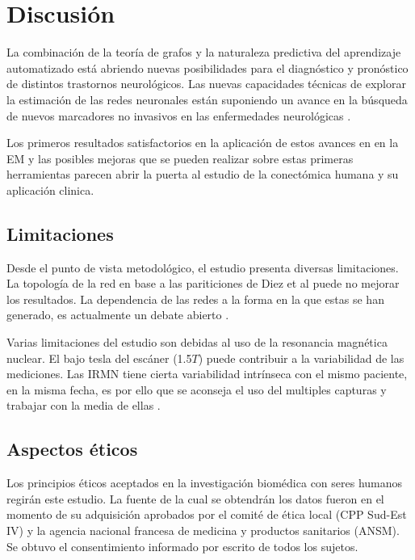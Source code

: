 \documentclass[fleqn,12pt]{UICArticle} %
\begin{document}
\section{Discusión}

La combinación de la teoría de grafos y la naturaleza predictiva del aprendizaje automatizado está abriendo nuevas posibilidades para el diagnóstico y pronóstico de distintos trastornos neurológicos. Las nuevas capacidades técnicas de explorar la estimación de las redes neuronales están suponiendo un avance en la búsqueda de nuevos marcadores no invasivos en las enfermedades neurológicas \cite{Tymofiyeva2017,Fornito2015,Sun2016}.

Los primeros resultados satisfactorios en la aplicación de estos avances en en la EM \cite{Kocevar2016,Muthuraman2016} y las posibles mejoras que se pueden realizar sobre estas primeras herramientas parecen abrir la puerta al estudio de la conectómica humana y su aplicación clinica.

\subsection{Limitaciones}

Desde el punto de vista metodológico, el estudio presenta diversas limitaciones. La topología de la red en base a las pariticiones de Diez et al puede no mejorar los resultados. La dependencia de las redes a la forma en la que estas se han generado, es actualmente un debate abierto \cite{Zalesky2010}. 

Varias limitaciones del estudio son debidas al uso de la resonancia magnética nuclear. El bajo tesla del escáner (1.5$T$) puede contribuir a la variabilidad de las mediciones. Las IRMN tiene cierta variabilidad intrínseca con el mismo paciente, en la misma fecha, es por ello que se aconseja el uso del multiples capturas y trabajar con la media de ellas \cite{Landman2007}.

\subsection{Aspectos éticos}

Los principios éticos aceptados en la investigación biomédica con seres humanos regirán este estudio. La fuente de la cual se obtendrán los datos fueron en el momento de su adquisición aprobados por el comité de ética local (CPP Sud-Est IV) y la agencia nacional francesa de medicina y productos sanitarios (ANSM). Se obtuvo el consentimiento informado por escrito de todos los sujetos.
\end{document}
